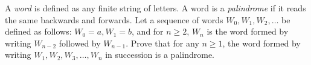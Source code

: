 A \emph{word} is defined as any finite string of letters. A word is a \emph{palindrome} if it reads the same backwards and forwards. Let a sequence of words $W_0,W_1,W_2,\ldots$ be defined as follows: $W_0=a,W_1=b$, and for $n\geq2$, $W_n$ is the word formed by writing $W_{n-2}$ followed by $W_{n-1}$. Prove that for any $n\geq1$, the word formed by writing $W_1,W_2,W_3,\ldots,W_n$ in succession is a palindrome.